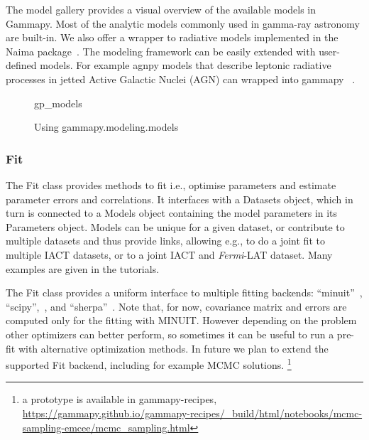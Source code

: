 The model gallery provides a visual overview of the available models in
Gammapy. Most of the analytic models  commonly used in gamma-ray astronomy are
built-in. We also offer a wrapper to radiative models implemented in the Naima
package~\cite{naima}. The modeling framework can be easily extended with
user-defined models. For example agnpy models that describe leptonic radiative
processes in jetted Active Galactic Nuclei (AGN) can wrapped into
gammapy~\citep[see section3.5 of ][]{2021arXiv211214573N} .

\begin{figure}
	{gp_models}
	\caption{Using gammapy.modeling.models}
	\label{fig*:minted:gp_models}
\end{figure}

\subsubsection{Fit}
\label{ssec:fit}

The Fit class provides methods to fit i.e., optimise parameters and estimate
parameter errors and correlations. It interfaces with a Datasets object, which
in turn is connected to a Models object containing the model parameters in its
Parameters object. Models can be unique for a given dataset, or contribute to
multiple datasets and thus provide links, allowing e.g., to do a joint fit to
multiple IACT datasets, or to a joint IACT and \textit{Fermi}-LAT dataset. Many
examples are given in the tutorials.

The Fit class provides a uniform interface to multiple fitting backends:
“minuit”~\citep{iminuit}, “scipy”,~\citep{2020SciPy-NMeth}, and
“sherpa”~\citep{sherpa-2005,sherpa-2011}. Note that, for now, covariance matrix
and errors are computed only for the fitting with MINUIT. However depending on
the problem other optimizers can better perform, so sometimes it can be useful
to run a pre-fit with alternative optimization methods. In future we plan to
extend the supported Fit backend, including for example MCMC solutions.
\footnote{a prototype is available in gammapy-recipes,
	\url{https://gammapy.github.io/gammapy-recipes/_build/html/notebooks/mcmc-sampling-emcee/mcmc_sampling.html}
}
